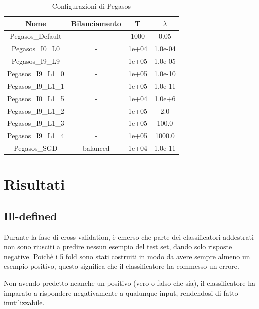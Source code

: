 \begin{table}[ht]%
\centering
\caption{Configurazioni di Pegasos}\label{tab:b3}
\begin{tabular}{|c|c|S[table-parse-only = true]|S[table-parse-only = true]|}
\hline
Nome                 & Bilanciamento &  T       & $\lambda$ \\
\hline 
Pegasos\_Default     & -             & 1000     & 0.05      \\
\hline 
Pegasos\_I0\_L0      & -             & 1e+04    & 1.0e-04   \\
\hline 
Pegasos\_I9\_L9      & -             & 1e+05    & 1.0e-05   \\
\hline 
Pegasos\_I9\_L1\_0   & -             & 1e+05    & 1.0e-10   \\
\hline 
Pegasos\_I9\_L1\_1   & -             & 1e+05    & 1.0e-11   \\
\hline 
Pegasos\_I0\_L1\_5   & -             & 1e+04    & 1.0e+6    \\
\hline 
Pegasos\_I9\_L1\_2   & -             & 1e+05    & 2.0       \\
\hline 
Pegasos\_I9\_L1\_3   & -             & 1e+05    & 100.0     \\
\hline 
Pegasos\_I9\_L1\_4   & -             & 1e+05    & 1000.0    \\
\hline 
Pegasos\_SGD         & balanced      & 1e+04    & 1.0e-11   \\
\hline 
\end{tabular} 
\end{table}

\newpage





\section{Risultati}

\subsection{Ill-defined}
Durante la fase di cross-validation, è emerso che parte dei classificatori addestrati non sono riusciti a predire nessun esempio del test set, dando solo risposte negative. Poichè i 5 fold sono stati costruiti in modo da avere sempre almeno un esempio positivo, questo significa che il classificatore ha commesso un errore.

Non avendo predetto neanche un positivo (vero o falso che sia), il classificatore ha imparato a rispondere negativamente a qualunque input, rendendosi di fatto inutilizzabile.

